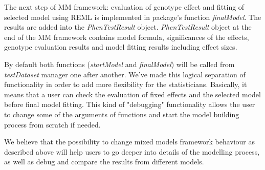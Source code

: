 \documentclass[12pt,a4paper]{article}
\begin{document}
The next step of MM framework: evaluation of genotype effect and fitting of selected model using REML is implemented in package's function \textit{finalModel}. 
The results are added into the \textit{PhenTestResult} object.  \textit{PhenTestResult} object at the end of the MM framework contains model formula, significances of the effects, genotype evaluation results and model fitting results including effect sizes.

By default both functions (\textit{startModel} and \textit{finalModel}) will be called from \textit{testDataset} manager one after another. 
We've made this logical separation of functionality in order to add more flexibility for the statisticians. 
Basically, it means that a user can check the evaluation of fixed effects and the selected model before final model fitting. 
This kind of "debugging" functionality allows the user to change some of the arguments of functions and start the model building process from scratch if needed.

We believe that the possibility to change mixed models framework behaviour as described above will help users to go deeper into details of the modelling process, as well as debug and compare the results from different models. 
\end{document}
